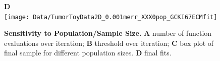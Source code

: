 \documentclass[10pt,letterpaper]{article}
\begin{document}
\begin{figure}[p]
 \textbf{D} \\
\texttt{[image: Data/TumorToyData2D\_0.001merr\_XXX0pop\_GCKI67ECMfit]}\\
\caption{{\bf Sensitivity to Population/Sample Size.}
\textbf{A}  number of function evaluations over iteration; \textbf{B} threshold over iteration; \textbf{C} box plot of final sample for different population sizes. \textbf{D} final fits.}
\label{fig4}
\end{figure}

%
%
%
%
\end{document}
